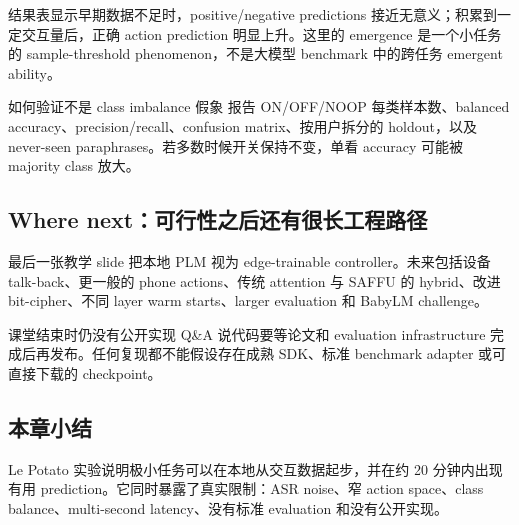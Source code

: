 结果表显示早期数据不足时，positive/negative predictions 接近无意义；积累到一定交互量后，正确 action prediction 明显上升。这里的 emergence 是一个小任务的 sample-threshold phenomenon，不是大模型 benchmark 中的跨任务 emergent ability。


\begin{importantbox}{如何验证不是 class imbalance 假象}
报告 ON/OFF/NOOP 每类样本数、balanced accuracy、precision/recall、confusion matrix、按用户拆分的 holdout，以及 never-seen paraphrases。若多数时候开关保持不变，单看 accuracy 可能被 majority class 放大。
\end{importantbox}


\subsection{Where next：可行性之后还有很长工程路径}

最后一张教学 slide 把本地 PLM 视为 edge-trainable controller。未来包括设备 talk-back、更一般的 phone actions、传统 attention 与 SAFFU 的 hybrid、改进 bit-cipher、不同 layer warm starts、larger evaluation 和 BabyLM challenge。


\begin{warningbox}{课堂结束时仍没有公开实现}
Q\&A 说代码要等论文和 evaluation infrastructure 完成后再发布。任何复现都不能假设存在成熟 SDK、标准 benchmark adapter 或可直接下载的 checkpoint。
\end{warningbox}



\subsection{本章小结}

Le Potato 实验说明极小任务可以在本地从交互数据起步，并在约 20 分钟内出现有用 prediction。它同时暴露了真实限制：ASR noise、窄 action space、class balance、multi-second latency、没有标准 evaluation 和没有公开实现。

